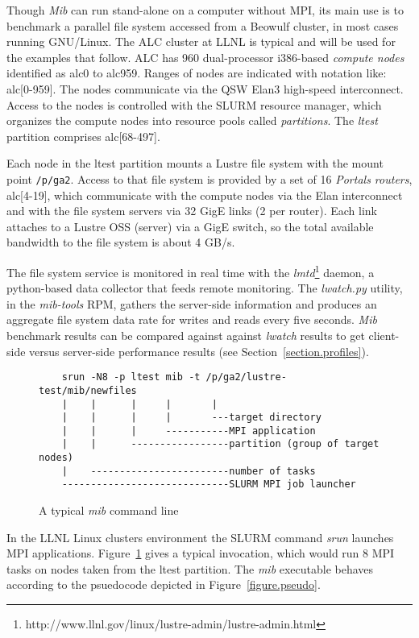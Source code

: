 \documentclass{article}
\begin{document}
Though {\em Mib} can run stand-alone on a computer without MPI, its main
use is to benchmark a parallel file system accessed from a Beowulf
cluster, in most cases running GNU/Linux.  The ALC cluster at LLNL is
typical and will be used for the examples that follow.  ALC has 960
dual-processor i386-based {\em compute nodes} identified as alc0 to
alc959.  Ranges of nodes are indicated with notation like: alc[0-959].
The nodes communicate via the QSW Elan3 high-speed interconnect.
Access to the nodes is controlled with the SLURM resource manager,
which organizes the compute nodes into resource pools called {\em
partitions}.  The {\em ltest} partition comprises alc[68-497].

Each node in the ltest partition mounts a Lustre file system with the
mount point \verb+/p/ga2+.  Access to that file system is provided by
a set of 16 {\em Portals routers}, alc[4-19], which communicate with
the compute nodes via the Elan interconnect and with the file system
servers via 32 GigE links (2 per router).  Each link attaches to a
Lustre OSS (server) via a GigE switch, so the total available
bandwidth to the file system is about 4 GB/s.  

The file system service is monitored in real time with the {\em
  lmtd}\footnote{http://www.llnl.gov/linux/lustre-admin/lustre-admin.html}
  daemon, a python-based data collector that feeds remote monitoring.
  The {\em lwatch.py} utility, in the {\em mib-tools} RPM, gathers the
  server-side information and produces an aggregate file system data
  rate for writes and reads every five seconds.  {\em Mib} benchmark
  results can be compared against against {\em lwatch} results to get
  client-side versus server-side performance results (see
  Section~\ref{section.profiles}).

\begin{figure}
  \begin{verbatim}
    srun -N8 -p ltest mib -t /p/ga2/lustre-test/mib/newfiles
    |    |      |     |       |
    |    |      |     |       ---target directory
    |    |      |     -----------MPI application
    |    |      -----------------partition (group of target nodes)
    |    ------------------------number of tasks
    -----------------------------SLURM MPI job launcher
  \end{verbatim}
\caption{A typical {\em mib} command line}
\label{figure.typical}
\end{figure}

In the LLNL Linux clusters environment the SLURM command {\em srun}
launches MPI applications.  Figure~\ref{figure.typical} gives a
typical invocation, which would run 8 MPI tasks on nodes taken from
the ltest partition.  The {\em mib} executable behaves according to
the psuedocode depicted in Figure~\ref{figure.pseudo}.
\end{document}
